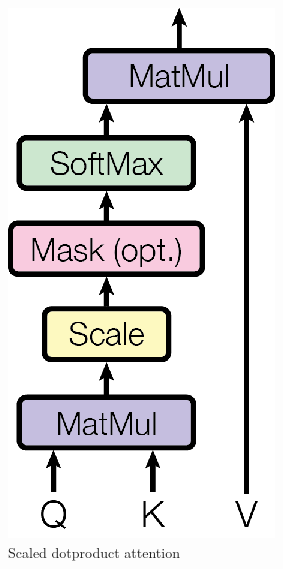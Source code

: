 \documentclass[conference]{IEEEtran}
\begin{document}
\begin{figure}[htbp]
\centerline{\includegraphics{img/scaled_dotproduct_attention.png}}
\caption{Scaled dotproduct attention \cite{attention_is_all_you_need}}
\label{fig}
\end{figure}
\end{document}
